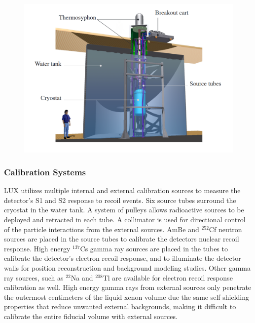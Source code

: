 \begin{figure} [!h]
\includegraphics[scale=.35]{LuxWaterTank.png} 
\label{LuxWaterTank}
\end{figure}

\subsubsection{Calibration Systems}

LUX utilizes multiple internal and external calibration sources to measure the detector's S1 and S2 response to recoil events.  Six source tubes surround the cryostat in the water tank.  A system of pulleys allows radioactive sources to be deployed and retracted in each tube.  A collimator is used for directional control of the particle interactions from the external sources. AmBe and $^{252}$Cf neutron sources are placed in the source tubes to calibrate the detectors nuclear recoil response.  High energy $^{137}$Cs gamma ray sources are placed in the tubes to calibrate the detector's electron recoil response, and to illuminate the detector walls for position reconstruction and background modeling studies.  Other gamma ray sources, such as $^{22}$Na and $^{208}$Tl are available for electron recoil response calibration as well.  High energy gamma rays from external sources only penetrate the outermost centimeters of the liquid xenon volume due the same self shielding properties that reduce unwanted external backgrounds, making it difficult to calibrate the entire fiducial volume with external sources.

